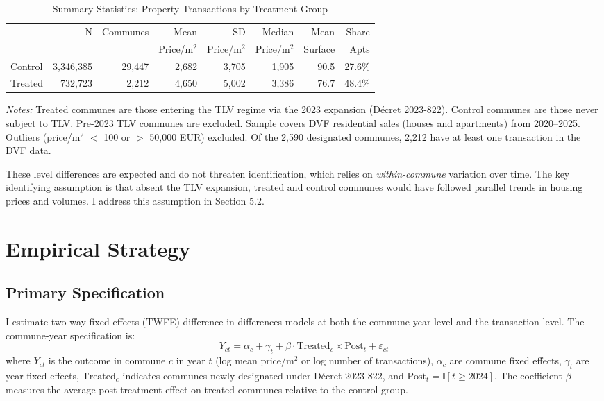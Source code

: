 \documentclass[12pt]{article}
\newcommand{\ind}{\mathbb{I}}
\begin{document}
\begin{table}[htbp]
\centering
\caption{Summary Statistics: Property Transactions by Treatment Group}
\label{tab:summary}
\begin{threeparttable}
\begin{tabular}{lrrrrrrr}
\toprule
 & N & Communes & Mean & SD & Median & Mean & Share \\
 & & & Price/m$^2$ & Price/m$^2$ & Price/m$^2$ & Surface & Apts \\
\midrule
Control & 3,346,385 & 29,447 & 2,682 & 3,705 & 1,905 & 90.5 & 27.6\% \\
Treated & 732,723 & 2,212 & 4,650 & 5,002 & 3,386 & 76.7 & 48.4\% \\
\bottomrule
\end{tabular}
\begin{tablenotes}[flushleft]\small
\item \textit{Notes:} Treated communes are those entering the TLV regime via the 2023 expansion (D\'ecret 2023-822). Control communes are those never subject to TLV. Pre-2023 TLV communes are excluded. Sample covers DVF residential sales (houses and apartments) from 2020--2025. Outliers (price/m$^2$ $<$ 100 or $>$ 50,000 EUR) excluded. Of the 2,590 designated communes, 2,212 have at least one transaction in the DVF data.
\end{tablenotes}
\end{threeparttable}
\end{table}

These level differences are expected and do not threaten identification, which relies on \textit{within-commune} variation over time. The key identifying assumption is that absent the TLV expansion, treated and control communes would have followed parallel trends in housing prices and volumes. I address this assumption in Section 5.2.


\section{Empirical Strategy}

\subsection{Primary Specification}

I estimate two-way fixed effects (TWFE) difference-in-differences models at both the commune-year level and the transaction level. The commune-year specification is:
\begin{equation}
    Y_{ct} = \alpha_c + \gamma_t + \beta \cdot \text{Treated}_c \times \text{Post}_t + \varepsilon_{ct}
    \label{eq:did}
\end{equation}
where $Y_{ct}$ is the outcome in commune $c$ in year $t$ (log mean price/m$^2$ or log number of transactions), $\alpha_c$ are commune fixed effects, $\gamma_t$ are year fixed effects, $\text{Treated}_c$ indicates communes newly designated under D\'ecret 2023-822, and $\text{Post}_t = \ind[t \geq 2024]$. The coefficient $\beta$ measures the average post-treatment effect on treated communes relative to the control group.
\end{document}
